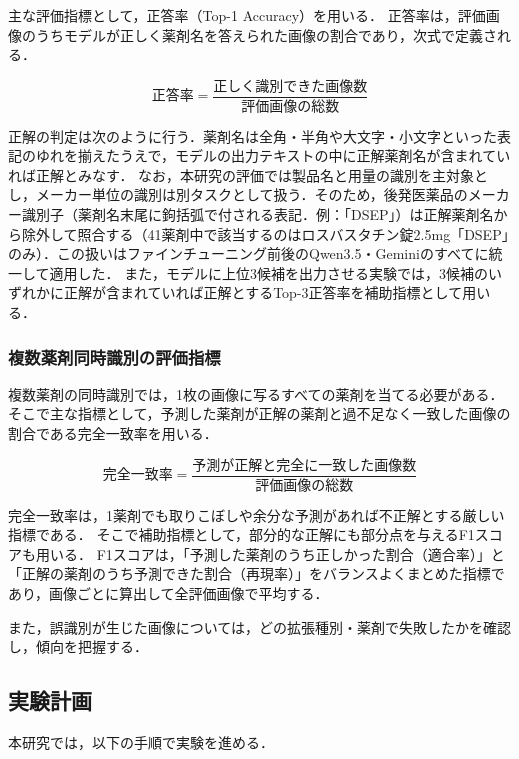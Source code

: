 \documentclass[dvipdfmx]{jsarticle}
\begin{document}
主な評価指標として，正答率（Top-1 Accuracy）を用いる．
正答率は，評価画像のうちモデルが正しく薬剤名を答えられた画像の割合であり，次式で定義される．

\begin{equation}
\text{正答率} = \frac{\text{正しく識別できた画像数}}{\text{評価画像の総数}}
\label{eq:top1}
\end{equation}

正解の判定は次のように行う．薬剤名は全角・半角や大文字・小文字といった表記のゆれを揃えたうえで，モデルの出力テキストの中に正解薬剤名が含まれていれば正解とみなす．
なお，本研究の評価では製品名と用量の識別を主対象とし，メーカー単位の識別は別タスクとして扱う．そのため，後発医薬品のメーカー識別子（薬剤名末尾に鉤括弧で付される表記．例：「DSEP」）は正解薬剤名から除外して照合する（41薬剤中で該当するのはロスバスタチン錠2.5mg「DSEP」のみ）．この扱いはファインチューニング前後のQwen3.5・Geminiのすべてに統一して適用した．
また，モデルに上位3候補を出力させる実験では，3候補のいずれかに正解が含まれていれば正解とするTop-3正答率を補助指標として用いる．

\subsubsection{複数薬剤同時識別の評価指標}

複数薬剤の同時識別では，1枚の画像に写るすべての薬剤を当てる必要がある．
そこで主な指標として，予測した薬剤が正解の薬剤と過不足なく一致した画像の割合である完全一致率を用いる．

\begin{equation}
\text{完全一致率} = \frac{\text{予測が正解と完全に一致した画像数}}{\text{評価画像の総数}}
\label{eq:exact}
\end{equation}

完全一致率は，1薬剤でも取りこぼしや余分な予測があれば不正解とする厳しい指標である．
そこで補助指標として，部分的な正解にも部分点を与えるF1スコアも用いる．
F1スコアは，「予測した薬剤のうち正しかった割合（適合率）」と「正解の薬剤のうち予測できた割合（再現率）」をバランスよくまとめた指標であり，画像ごとに算出して全評価画像で平均する．

また，誤識別が生じた画像については，どの拡張種別・薬剤で失敗したかを確認し，傾向を把握する．

\subsection{実験計画}

本研究では，以下の手順で実験を進める．
\end{document}
